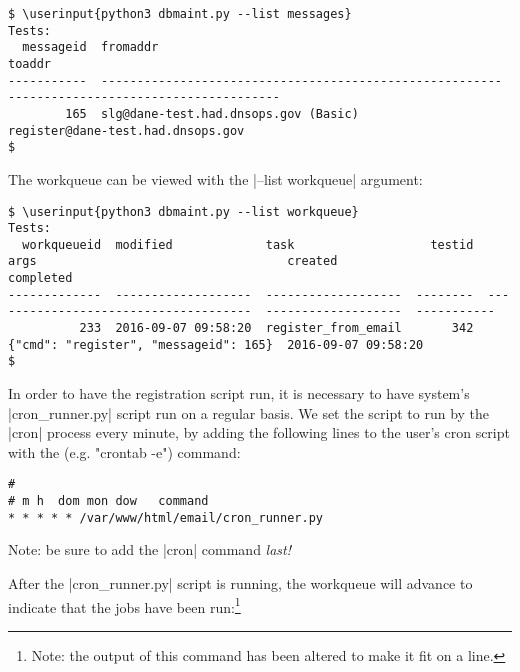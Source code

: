 \documentclass[preprint,3p,11pt]{elsarticle}
\newcommand\userinput[1]{\textbf{#1}}
\begin{document}
\begin{Verbatim}[commandchars=\\\{\},fontsize=\small]
$ \userinput{python3 dbmaint.py --list messages}
Tests:
  messageid  fromaddr                                                  toaddr                                    
-----------  --------------------------------------------------------  --------------------------------------
        165  slg@dane-test.had.dnsops.gov (Basic)                      register@dane-test.had.dnsops.gov         
$
\end{Verbatim}

The workqueue can be viewed with the |--list workqueue| argument:

\begin{Verbatim}[commandchars=\\\{\},fontsize=\footnotesize]
$ \userinput{python3 dbmaint.py --list workqueue}
Tests:
  workqueueid  modified             task                   testid  args                                   created                completed
-------------  -------------------  -------------------  --------  -------------------------------------  -------------------  -----------
          233  2016-09-07 09:58:20  register_from_email       342  {"cmd": "register", "messageid": 165}  2016-09-07 09:58:20
$
\end{Verbatim}


In order to have the registration script run, it is necessary to have
system's |cron_runner.py| script run on a regular basis. We set the
script to run by the |cron| process every minute, by adding the
following lines to the user's cron script with the (e.g. "crontab
-e") command:

\begin{Verbatim}[commandchars=\\\{\},fontsize=\small]
#
# m h  dom mon dow   command
* * * * * /var/www/html/email/cron_runner.py
\end{Verbatim}

Note: be sure to add the |cron| command \emph{last!}

After the |cron_runner.py| script is running, the workqueue will
advance to indicate that the jobs have been run:\footnote{Note: the
  output of this command has been altered to make it fit on a line.}
\end{document}
